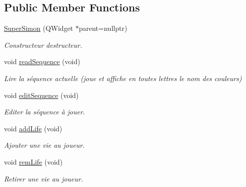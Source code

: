 \subsection*{Public Member Functions}
\begin{DoxyCompactItemize}
\item 
\hyperlink{class_super_simon_a203f799a56234b59ba692ed5b7a74537}{Super\+Simon} (Q\+Widget $\ast$parent=nullptr)
\begin{DoxyCompactList}\small\item\em Constructeur destructeur. \end{DoxyCompactList}\item 
\mbox{\label{class_super_simon_a1676872fe3b03afef6ce057beae773b8}} 
void \hyperlink{class_super_simon_a1676872fe3b03afef6ce057beae773b8}{read\+Sequence} (void)
\begin{DoxyCompactList}\small\item\em Lire la séquence actuelle (joue et affiche en toutes lettres le nom des couleurs) \end{DoxyCompactList}\item 
void \hyperlink{class_super_simon_af00408823847e80a511019baa536afb3}{edit\+Sequence} (void)
\begin{DoxyCompactList}\small\item\em Editer la séquence à jouer. \end{DoxyCompactList}\item 
\mbox{\label{class_super_simon_a611cecfe4b8945c9ce70c206e64a6038}} 
void \hyperlink{class_super_simon_a611cecfe4b8945c9ce70c206e64a6038}{add\+Life} (void)
\begin{DoxyCompactList}\small\item\em Ajouter une vie au joueur. \end{DoxyCompactList}\item 
\mbox{\label{class_super_simon_a081108169be3715de506ccaebebf01d9}} 
void \hyperlink{class_super_simon_a081108169be3715de506ccaebebf01d9}{rem\+Life} (void)
\begin{DoxyCompactList}\small\item\em Retirer une vie au joueur. \end{DoxyCompactList}\item 
\mbox{\label{class_super_simon_a9c3cccc53f6445c0bf03b30dd6528340}} 

\end{DoxyCompactItemize}
